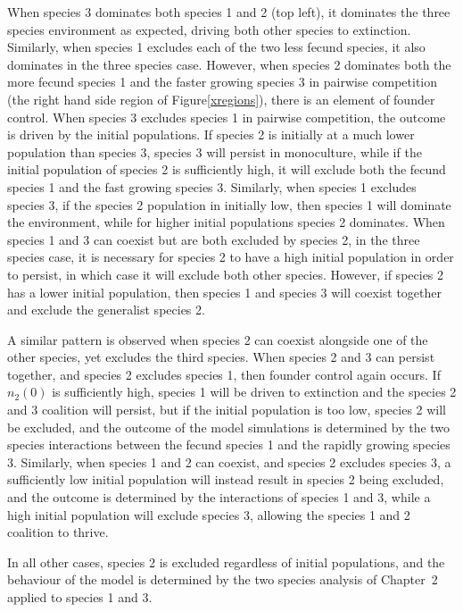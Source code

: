 When species 3 dominates both species 1 and 2 (top left), it dominates the three species environment as expected, driving both other species to extinction. Similarly, when species 1 excludes each of the two less fecund species, it also dominates in the three species case. However, when species 2 dominates both the more fecund species 1 and the faster growing species 3 in pairwise competition (the right hand side region of Figure\ref{xregions}), there is an element of founder control. When species 3 excludes species 1 in pairwise competition, the outcome is driven by the initial populations. If species 2 is initially at a much lower population than species 3, species 3 will persist in monoculture, while if the initial population of species 2 is sufficiently high, it will exclude both the fecund species 1 and the fast growing species 3. Similarly, when species 1 excludes species 3, if the species 2 population in initially low, then species 1 will dominate the environment, while for higher initial populations species 2 dominates. When species 1 and 3 can coexist but are both excluded by species 2, in the three species case, it is necessary for species 2 to have a high initial population in order to persist, in which case it will exclude both other species. However, if species 2 has a lower initial population, then species 1 and species 3 will coexist together and exclude the generalist species 2.

A similar pattern is observed when species 2 can coexist alongside one of the other species, yet excludes the third species. When species 2 and 3 can persist together, and species 2 excludes species 1, then founder control again occurs. If $n_2(0)$ is sufficiently high, species 1 will be driven to extinction and the species 2 and 3 coalition will persist, but if the initial population is too low, species 2 will be excluded, and the outcome of the model simulations is determined by the two species interactions between the fecund species 1 and the rapidly growing species 3. Similarly, when species 1 and 2 can coexist, and species 2 excludes species 3, a sufficiently low initial population will instead result in species 2 being excluded, and the outcome is determined by the interactions of species 1 and 3, while a high initial population will exclude species 3, allowing the species 1 and 2 coalition to thrive.

In all other cases, species 2 is excluded regardless of initial populations, and the behaviour of the model is determined by the two species analysis of Chapter~2 applied to species 1 and 3.

